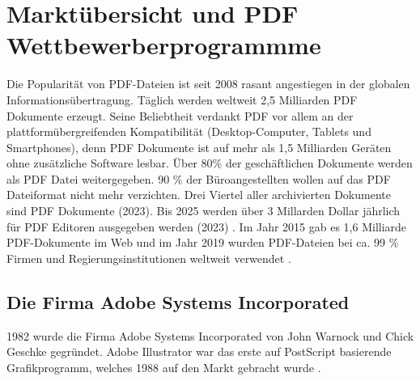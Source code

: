 \chapter{Marktübersicht und PDF Wettbewerberprogrammme}
Die Popularität von PDF-Dateien ist seit 2008 rasant angestiegen in der globalen Informationsübertragung. Täglich werden weltweit 2,5 Milliarden PDF Dokumente erzeugt. Seine Beliebtheit verdankt PDF vor allem an der plattformübergreifenden Kompatibilität (Desktop-Computer, Tablets und Smartphones), denn PDF Dokumente ist auf mehr als 1,5 Milliarden Geräten ohne zusätzliche Software lesbar. Über 80\% der geschäftlichen Dokumente werden als PDF Datei weitergegeben. \cite{formilo} 90 \% der Büroangestellten wollen auf das PDF Dateiformat nicht mehr verzichten. Drei Viertel aller archivierten Dokumente sind PDF Dokumente (2023).
Bis 2025 werden über 3 Millarden Dollar jährlich für PDF Editoren ausgegeben werden (2023) \cite{kofax}. Im Jahr 2015 gab es 1,6 Milliarde PDF-Dokumente im Web und im Jahr 2019 wurden PDF-Dateien bei ca. 99 \% Firmen und Regierungsinstitutionen weltweit verwendet \cite{ccc-break-pdf}. 

\section{Die Firma Adobe Systems Incorporated}
1982 wurde die Firma Adobe Systems Incorporated von John Warnock und Chick Geschke gegründet. Adobe Illustrator war das erste auf PostScript basierende Grafikprogramm, welches 1988 auf den Markt gebracht wurde \cite{schneeberger}.















